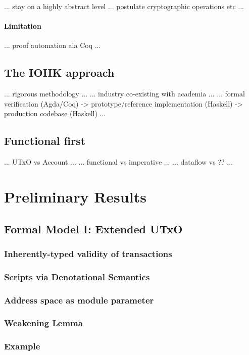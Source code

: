 \documentclass[acmsmall,nonacm=true,screen=true]{acmart}\settopmatter{printfolios=false,printccs=false,printacmref=false}
\begin{document}
... stay on a highly abstract level ... postulate cryptographic operations etc ...

\paragraph{Limitation}
... proof automation ala Coq ...

\subsection{The IOHK approach}

... rigorous methodology ...
... industry co-existing with academia ...
... formal verification (Agda/Coq) -> prototype/reference implementation (Haskell) -> production codebase (Haskell) ...

\subsection{Functional first}

... UTxO vs Account ...
... functional vs imperative ...
... dataflow vs ?? ...

\section{Preliminary Results}
\label{sec:results}

\subsection{Formal Model I: Extended UTxO}
\subsubsection{Inherently-typed validity of transactions}
\subsubsection{Scripts via Denotational Semantics}
\subsubsection{Address space as module parameter}
\subsubsection{Weakening Lemma}
\subsubsection{Example}
\end{document}
